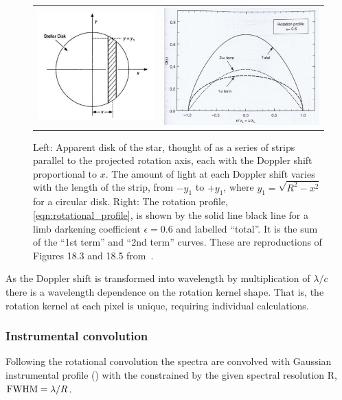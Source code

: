 \begin{figure}
    \centering
    \begin{tabular}{cc}
        \includegraphics[width=0.45\linewidth]{figures/information-content/rotation_diagram} & \includegraphics[width=0.45\linewidth]{figures/information-content/rotational_profile}\\
    \end{tabular}
    \caption{Left: Apparent disk of the star, thought of as a series of strips parallel to the projected rotation axis, each with the Doppler shift proportional to \(x\).
        The amount of light at each Doppler shift varies with the length of the strip, from \(-y_1\) to \(+y_1\), where \(y_1 = \sqrt{R^2-x^2}\) for a circular disk.
        Right: The rotation profile, \cref{eqn:rotational_profile}, is shown by the solid line black line for a limb darkening coefficient \(\epsilon=0.6\) and labelled ``total''.
        It is the sum of the ``1st term'' and ``2nd term'' curves.
        These are reproductions of Figures 18.3 and 18.5 from~\citep{gray_observation_2005}.}
    \label{fig:rotationdiagram_and_profile}
\end{figure}


As the Doppler shift \Vsini{} is transformed into wavelength by multiplication of $\lambda / c$ there is a wavelength dependence on the rotation kernel shape.
That is, the rotation kernel at each pixel is unique, requiring individual calculations.

\subsubsection*{Instrumental convolution}
\label{subsubsec:instrumental_convolution}
Following the rotational convolution the spectra are convolved with Gaussian instrumental profile ({\IP{}}) with the {\fwhm}  constrained by the given spectral resolution R, $\textrm{FWHM}=\lambda/R$.

